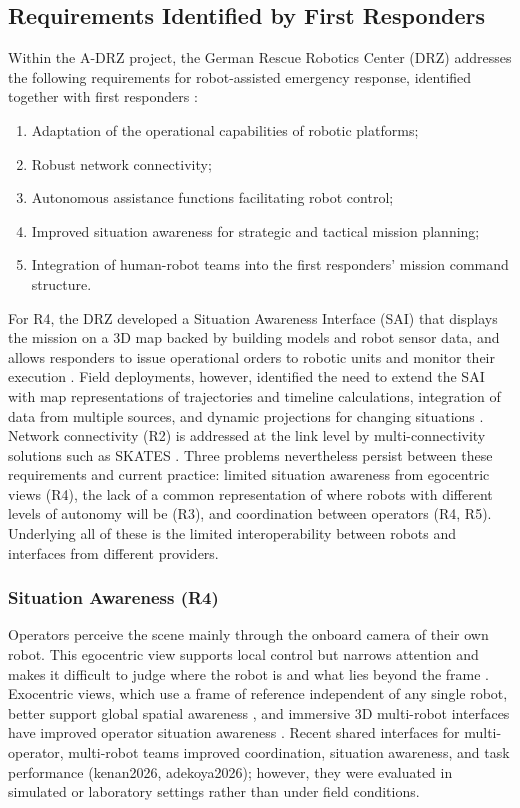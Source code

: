 \documentclass{article}
\begin{document}
\subsection{Requirements Identified by First Responders}
Within the A-DRZ project, the German Rescue Robotics Center (DRZ) addresses the following requirements for robot-assisted emergency response, identified together with first responders \cite{kruijff2021}:
\begin{enumerate}[label=\textbf{R\arabic*}]
  \item Adaptation of the operational capabilities of robotic platforms;
  \item Robust network connectivity;
  \item Autonomous assistance functions facilitating robot control;
  \item Improved situation awareness for strategic and tactical mission planning;
  \item Integration of human-robot teams into the first responders' mission command structure.
\end{enumerate}
For R4, the DRZ developed a Situation Awareness Interface (SAI) that displays the mission on a 3D map backed by building models and robot sensor data, and allows responders to issue operational orders to robotic units and monitor their execution \cite{kruijff2021}.
Field deployments, however, identified the need to extend the SAI with map representations of trajectories and timeline calculations, integration of data from multiple sources, and dynamic projections for changing situations \cite{surmann2024}.
Network connectivity (R2) is addressed at the link level by multi-connectivity solutions such as SKATES \cite{kruijff2021}.
Three problems nevertheless persist between these requirements and current practice: limited situation awareness from egocentric views (R4), the lack of a common representation of where robots with different levels of autonomy will be (R3), and coordination between operators (R4, R5).
Underlying all of these is the limited interoperability between robots and interfaces from different providers.

\subsubsection{Situation Awareness (R4)}
Operators perceive the scene mainly through the onboard camera of their own robot.
This egocentric view supports local control but narrows attention and makes it difficult to judge where the robot is and what lies beyond the frame \cite{thomas2001, riley2004, hollands2011}.
Exocentric views, which use a frame of reference independent of any single robot, better support global spatial awareness \cite{wickens1995, pavlovic2009}, and immersive 3D multi-robot interfaces have improved operator situation awareness \cite{roldan2017}.
Recent shared interfaces for multi-operator, multi-robot teams improved coordination, situation awareness, and task performance (kenan2026, adekoya2026); however, they were evaluated in simulated or laboratory settings rather than under field conditions.
\end{document}
